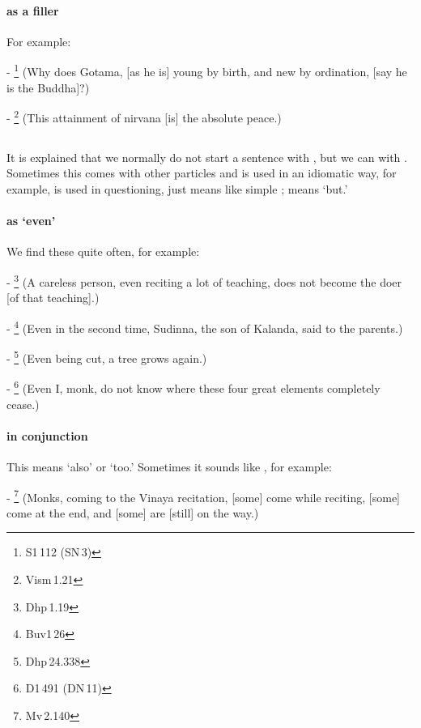 \paragraph*{ as a filler} For example:\par
- \footnote{S1\,112 (SN\,3)} (Why does Gotama, [as he is] young by birth, and new by ordination, [say he is the Buddha]?) \par
- \footnote{Vism\,1.21} (This attainment of nirvana [is] the absolute peace.) \par

\subsection*{}\label{nip:pi}\label{nip:api}
It is explained that we normally do not start a sentence with , but we can with . Sometimes this comes with other particles and is used in an idiomatic way, for example,  is used in questioning, just means like simple ;  means `but.'
\paragraph*{ as `even'} We find these quite often, for example:\par
- \footnote{Dhp\,1.19} (A careless person, even reciting a lot of teaching, does not become the doer [of that teaching].) \par
- \footnote{Buv1\,26} (Even in the second time, Sudinna, the son of Kalanda, said to the parents.) \par
- \footnote{Dhp\,24.338} (Even being cut, a tree grows again.) \par
- \footnote{D1\,491 (DN\,11)} (Even I, monk, do not know where these four great elements completely cease.) \par
\paragraph*{ in conjunction} This means `also' or `too.' Sometimes it sounds like , for example:\par
- \footnote{Mv\,2.140} (Monks, coming to the Vinaya recitation, [some] come while reciting, [some] come at the end, and [some] are [still] on the way.) \par
